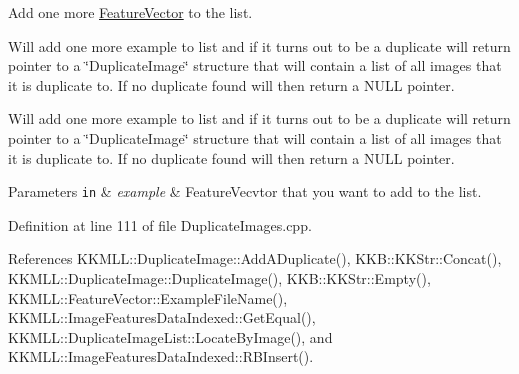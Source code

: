 Add one more \hyperlink{class_k_k_m_l_l_1_1_feature_vector}{Feature\+Vector} to the list. 

Will add one more example to list and if it turns out to be a duplicate will return pointer to a \char`\"{}\+Duplicate\+Image\char`\"{} structure that will contain a list of all images that it is duplicate to. If no duplicate found will then return a N\+U\+LL pointer.

Will add one more example to list and if it turns out to be a duplicate will return pointer to a \char`\"{}\+Duplicate\+Image\char`\"{} structure that will contain a list of all images that it is duplicate to. If no duplicate found will then return a N\+U\+LL pointer. 
\begin{DoxyParams}[1]{Parameters}
\mbox{\tt in}  & {\em example} & Feature\+Vecvtor that you want to add to the list. \\
\hline
\end{DoxyParams}


Definition at line 111 of file Duplicate\+Images.\+cpp.



References K\+K\+M\+L\+L\+::\+Duplicate\+Image\+::\+Add\+A\+Duplicate(), K\+K\+B\+::\+K\+K\+Str\+::\+Concat(), K\+K\+M\+L\+L\+::\+Duplicate\+Image\+::\+Duplicate\+Image(), K\+K\+B\+::\+K\+K\+Str\+::\+Empty(), K\+K\+M\+L\+L\+::\+Feature\+Vector\+::\+Example\+File\+Name(), K\+K\+M\+L\+L\+::\+Image\+Features\+Data\+Indexed\+::\+Get\+Equal(), K\+K\+M\+L\+L\+::\+Duplicate\+Image\+List\+::\+Locate\+By\+Image(), and K\+K\+M\+L\+L\+::\+Image\+Features\+Data\+Indexed\+::\+R\+B\+Insert().


